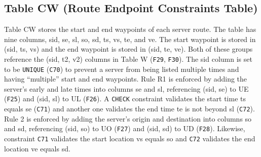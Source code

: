 \subsection{Table CW (Route Endpoint Constraints Table)}
Table CW stores the start and end waypoints of each server route.  The table
has nine columns, \textsf{sid}, \textsf{se}, \textsf{sl}, \textsf{so},
\textsf{sd}, \textsf{ts}, \textsf{vs}, \textsf{te}, and \textsf{ve}.  The start
waypoint is stored in (\textsf{sid}, \textsf{ts}, \textsf{vs}) and the end
waypoint is stored in (\textsf{sid}, \textsf{te}, \textsf{ve}). Both of these
groups reference the (\textsf{sid}, \textsf{t2}, \textsf{v2}) columns in Table
W ({\tt{}F29}, {\tt{}F30}).  The \textsf{sid} column is set to be \texttt{UNIQUE}
({\tt{}C70}) to prevent a server from being listed multiple times and having
``multiple'' start and end waypoints.  Rule R1 is enforced by adding the
server's early and late times into columns \textsf{se} and \textsf{sl},
referencing (\textsf{sid}, \textsf{se}) to UE ({\tt{}F25}) and (\textsf{sid},
\textsf{sl}) to UL ({\tt{}F26}).  A \texttt{CHECK} constraint validates the start
time \textsf{ts} equals \textsf{se} ({\tt{}C71}) and another one validates the end
time \textsf{te} is not beyond \textsf{sl} ({\tt{}C72}).  Rule 2 is enforced by
adding the server's origin and destination into columns \textsf{so} and
\textsf{sd}, referencing (\textsf{sid}, \textsf{so}) to UO ({\tt{}F27}) and
(\textsf{sid}, \textsf{sd}) to UD ({\tt{}F28}).  Likewise, constraint {\tt{}C71}
validates the start location \textsf{vs} equals \textsf{so} and {\tt{}C72}
validates the end location \textsf{ve} equals \textsf{sd}.
